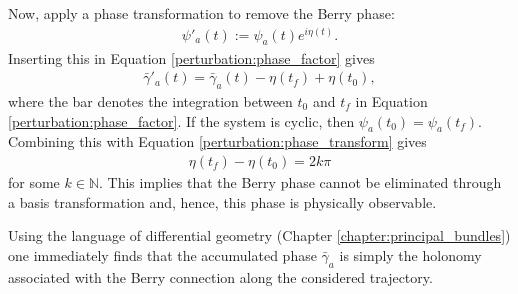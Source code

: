     Now, apply a phase transformation to remove the Berry phase:
    \begin{gather}
        \label{perturbation:phase_transform}
        \psi'_a(t) := \psi_a(t)e^{i\eta(t)}.
    \end{gather}
    Inserting this in Equation \eqref{perturbation:phase_factor} gives
    \begin{gather}
        \bar\gamma'_a(t) = \bar\gamma_a(t) - \eta(t_f) + \eta(t_0),
    \end{gather}
    where the bar denotes the integration between $t_0$ and $t_f$ in Equation \eqref{perturbation:phase_factor}. If the system is cyclic, then $\psi_a(t_0) = \psi_a(t_f)$. Combining this with Equation \eqref{perturbation:phase_transform} gives
    \begin{gather}
        \eta(t_f) - \eta(t_0) = 2k\pi
    \end{gather}
    for some $k\in\mathbb{N}$. This implies that the Berry phase cannot be eliminated through a basis transformation and, hence, this phase is physically observable.

    \begin{remark}[$\clubsuit$]
        Using the language of differential geometry (Chapter \ref{chapter:principal_bundles}) one immediately finds that the accumulated phase $\bar\gamma_a$ is simply the holonomy associated with the Berry connection along the considered trajectory.
    \end{remark}